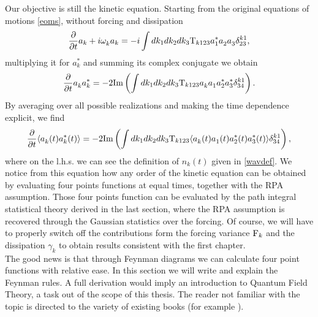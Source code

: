Our objective is still the kinetic equation. Starting from the original equations of motions \eqref{eoms}, without forcing and dissipation
\begin{equation}
    \frac{\partial}{\partial t} a_k + i \omega^{}_k a_k = -i \int dk_1 dk_2 dk_3\mathrm{T}_{k123} a_1^*a_2^{}a_3^{} \delta^{k1}_{23},
\end{equation}
multiplying it for $a_k^*$ and summing its complex conjugate we obtain
\begin{equation}
    \frac{\partial}{\partial t} a_k^{} a_k^* = -2 \text{Im}\left( \int dk_1 dk_2 dk_3\mathrm{T}_{k123}a_k^{} a_1^{} a_2^* a_3^* \delta^{k1}_{34} \right).
\end{equation} 
By averaging over all possible realizations and making the time dependence explicit, we find
\begin{equation}
    \frac{\partial}{\partial t} \langle a_k^{}(t) a_k^*(t) \rangle = -2 \text{Im}\left( \int dk_1 dk_2 dk_3\mathrm{T}_{k123}\langle a_k^{}(t) a_1^{} (t)a_2^*(t) a_3^* (t)\rangle\delta^{k1}_{34} \right),
    \label{kineticprototype}
\end{equation}
where on the l.h.s. we can see the definition of $n_k(t)$ given in \eqref{wavdef}. We notice from this equation how any order of the kinetic equation can be obtained 
by evaluating four points functions at equal times, together with the RPA assumption. Those four points function can be evaluated by the path integral statistical theory 
derived in the last section, where the RPA assumption is recovered through the Gaussian statistics over the forcing. Of course, we will have to properly 
switch off the contributions form the forcing variance $\mathrm{F}_k$ and the dissipation $\gamma_k$ to obtain results consistent with the first chapter. \\
The good news is that through Feynman diagrams we can calculate four point functions with relative ease. In this section we will write and explain the Feynman rules. 
A full derivation would imply an introduction to Quantum Field Theory, a task out of the scope of this thesis. The reader not familiar with the topic is directed to 
the variety of existing books (for example \cite{Bjorken:1965zz}). \\

